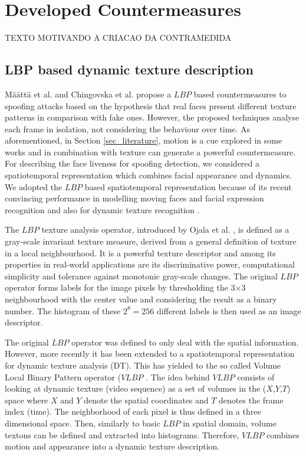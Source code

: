 \chapter{Developed Countermeasures}
\label{chap:Proposed_Countermeasures}

TEXTO MOTIVANDO A CRIACAO DA CONTRAMEDIDA

\section{LBP based dynamic texture description}
\label{sec_dynamic}

M\"{a}\"{a}tt\"{a} et al. \cite{maatta2011face} and Chingovska et al. \cite{ChingovskaBIOSIG2012} propose a $LBP$ based countermeasures to spoofing attacks based on the hypothesis that real faces  present different texture patterns in comparison with fake ones. However, the proposed techniques analyse each frame in isolation, not considering the behaviour over time. As aforementioned, in Section \ref{sec_literature}, motion is a cue explored in some works and in combination with texture can generate a powerful countermeasure. For describing the face liveness for spoofing detection, we considered a spatiotemporal representation which combines facial appearance and dynamics. We adopted the $LBP$ based spatiotemporal representation because of its recent convincing performance in modelling moving faces and facial expression recognition and also for dynamic texture recognition \cite{pietikainen2011computer}. 

The $LBP$ texture analysis operator, introduced by Ojala et al. \cite{hadid:62,hadid:39}, is defined as a gray-scale invariant  texture measure, derived from a general definition of texture in a local neighbourhood. It is a powerful texture descriptor and among its properties in real-world applications are its discriminative power, computational simplicity and tolerance against monotonic gray-scale changes. The original $LBP$ operator forms labels for the image pixels by thresholding the 3$\times$3 neighbourhood with the center value and considering the result as a binary number. The histogram of these $2^8=256$ different labels is then used as an image descriptor.

The original $LBP$ operator was defined to only deal with the spatial information. However, more recently it has been extended to a spatiotemporal representation for dynamic texture analysis (DT). This has yielded to the so called Volume Local Binary Pattern operator ($VLBP$ \cite{zhao2007dynamic}. The idea behind $VLBP$ consists of looking at dynamic texture (video sequence) as a set of volumes in the ($X$,$Y$,$T$) space where $X$ and $Y$ denote the spatial coordinates and $T$ denotes the frame index (time). The neighborhood of each pixel is thus defined in a three dimensional space. Then, similarly to basic $LBP$ in spatial domain, volume textons can be defined and extracted into histograms. Therefore, $VLBP$ combines motion and appearance into a dynamic texture description.

